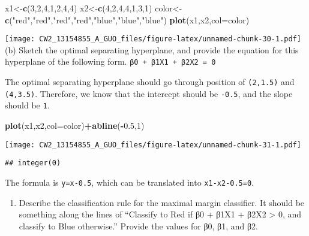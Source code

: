 \documentclass[]{article}
\newenvironment{Shaded}{\begin{snugshade}}{\end{snugshade}}
\newcommand{\KeywordTok}[1]{\textcolor[rgb]{0.13,0.29,0.53}{\textbf{#1}}}
\newcommand{\DataTypeTok}[1]{\textcolor[rgb]{0.13,0.29,0.53}{#1}}
\newcommand{\DecValTok}[1]{\textcolor[rgb]{0.00,0.00,0.81}{#1}}
\newcommand{\FloatTok}[1]{\textcolor[rgb]{0.00,0.00,0.81}{#1}}
\newcommand{\StringTok}[1]{\textcolor[rgb]{0.31,0.60,0.02}{#1}}
\newcommand{\OperatorTok}[1]{\textcolor[rgb]{0.81,0.36,0.00}{\textbf{#1}}}
\newcommand{\NormalTok}[1]{#1}
\providecommand{\tightlist}{%
  \setlength{\itemsep}{0pt}\setlength{\parskip}{0pt}}
\begin{document}
\begin{Shaded}
\begin{Highlighting}[]
\NormalTok{x1<-}\KeywordTok{c}\NormalTok{(}\DecValTok{3}\NormalTok{,}\DecValTok{2}\NormalTok{,}\DecValTok{4}\NormalTok{,}\DecValTok{1}\NormalTok{,}\DecValTok{2}\NormalTok{,}\DecValTok{4}\NormalTok{,}\DecValTok{4}\NormalTok{)}
\NormalTok{x2<-}\KeywordTok{c}\NormalTok{(}\DecValTok{4}\NormalTok{,}\DecValTok{2}\NormalTok{,}\DecValTok{4}\NormalTok{,}\DecValTok{4}\NormalTok{,}\DecValTok{1}\NormalTok{,}\DecValTok{3}\NormalTok{,}\DecValTok{1}\NormalTok{)}
\NormalTok{color<-}\KeywordTok{c}\NormalTok{(}\StringTok{"red"}\NormalTok{,}\StringTok{"red"}\NormalTok{,}\StringTok{"red"}\NormalTok{,}\StringTok{"red"}\NormalTok{,}\StringTok{"blue"}\NormalTok{,}\StringTok{"blue"}\NormalTok{,}\StringTok{"blue"}\NormalTok{)}
\KeywordTok{plot}\NormalTok{(x1,x2,}\DataTypeTok{col=}\NormalTok{color)}
\end{Highlighting}
\end{Shaded}

\texttt{[image: CW2\_13154855\_A\_GUO\_files/figure-latex/unnamed-chunk-30-1.pdf]}
(b) Sketch the optimal separating hyperplane, and provide the equation
for this hyperplane of the following form.
\texttt{β0\ +\ β1X1\ +\ β2X2\ =\ 0}

The optimal separating hyperplane should go through position of
\texttt{(2,1.5)} and \texttt{(4,3.5)}. Therefore, we know that the
intercept should be \texttt{-0.5}, and the slope should be \texttt{1}.

\begin{Shaded}
\begin{Highlighting}[]
\KeywordTok{plot}\NormalTok{(x1,x2,}\DataTypeTok{col=}\NormalTok{color)}\OperatorTok{+}\KeywordTok{abline}\NormalTok{(}\OperatorTok{-}\FloatTok{0.5}\NormalTok{,}\DecValTok{1}\NormalTok{)}
\end{Highlighting}
\end{Shaded}

\texttt{[image: CW2\_13154855\_A\_GUO\_files/figure-latex/unnamed-chunk-31-1.pdf]}

\begin{verbatim}
## integer(0)
\end{verbatim}

The formula is \texttt{y=x-0.5}, which can be translated into
\texttt{x1-x2-0.5=0}.

\begin{enumerate}
\def\labelenumi{(\alph{enumi})}
\setcounter{enumi}{2}
\tightlist
\item
  Describe the classification rule for the maximal margin classifier. It
  should be something along the lines of ``Classify to Red if β0 + β1X1
  + β2X2 \textgreater{} 0, and classify to Blue otherwise.'' Provide the
  values for β0, β1, and β2.
\end{enumerate}
\end{document}
